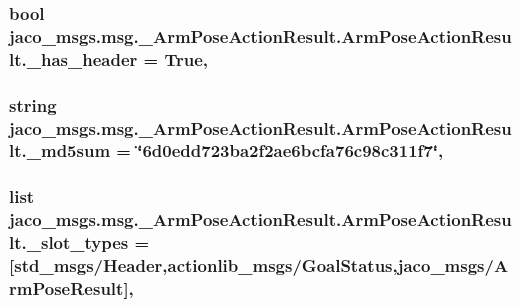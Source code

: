 \subsubsection[{\texorpdfstring{\+\_\+has\+\_\+header}{_has_header}}]{\setlength{\rightskip}{0pt plus 5cm}bool jaco\+\_\+msgs.\+msg.\+\_\+\+Arm\+Pose\+Action\+Result.\+Arm\+Pose\+Action\+Result.\+\_\+has\+\_\+header = True\hspace{0.3cm}{\ttfamily [static]}, {\ttfamily [private]}}\hypertarget{classjaco__msgs_1_1msg_1_1__ArmPoseActionResult_1_1ArmPoseActionResult_aaf45e5afc0067a2be59ebc9f4c2e7624}{}\label{classjaco__msgs_1_1msg_1_1__ArmPoseActionResult_1_1ArmPoseActionResult_aaf45e5afc0067a2be59ebc9f4c2e7624}
\subsubsection[{\texorpdfstring{\+\_\+md5sum}{_md5sum}}]{\setlength{\rightskip}{0pt plus 5cm}string jaco\+\_\+msgs.\+msg.\+\_\+\+Arm\+Pose\+Action\+Result.\+Arm\+Pose\+Action\+Result.\+\_\+md5sum = \char`\"{}6d0edd723ba2f2ae6bcfa76c98c311f7\char`\"{}\hspace{0.3cm}{\ttfamily [static]}, {\ttfamily [private]}}\hypertarget{classjaco__msgs_1_1msg_1_1__ArmPoseActionResult_1_1ArmPoseActionResult_ab3191a9dcae3c8ab00f0be09fe4ce2f6}{}\label{classjaco__msgs_1_1msg_1_1__ArmPoseActionResult_1_1ArmPoseActionResult_ab3191a9dcae3c8ab00f0be09fe4ce2f6}
\subsubsection[{\texorpdfstring{\+\_\+slot\+\_\+types}{_slot_types}}]{\setlength{\rightskip}{0pt plus 5cm}list jaco\+\_\+msgs.\+msg.\+\_\+\+Arm\+Pose\+Action\+Result.\+Arm\+Pose\+Action\+Result.\+\_\+slot\+\_\+types = \mbox{[}\textquotesingle{}std\+\_\+msgs/Header\textquotesingle{},\textquotesingle{}actionlib\+\_\+msgs/Goal\+Status\textquotesingle{},\textquotesingle{}jaco\+\_\+msgs/{\bf Arm\+Pose\+Result}\textquotesingle{}\mbox{]}\hspace{0.3cm}{\ttfamily [static]}, {\ttfamily [private]}}\hypertarget{classjaco__msgs_1_1msg_1_1__ArmPoseActionResult_1_1ArmPoseActionResult_a904685ef10791779a38d4f88687fc57d}{}\label{classjaco__msgs_1_1msg_1_1__ArmPoseActionResult_1_1ArmPoseActionResult_a904685ef10791779a38d4f88687fc57d}


